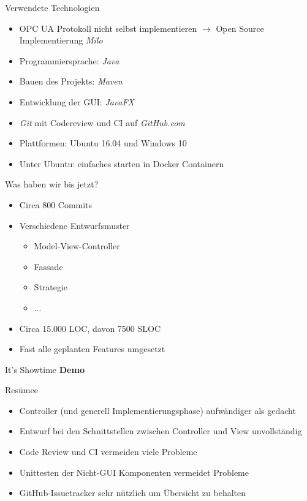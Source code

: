 \documentclass[22pt]{beamer}
\begin{document}
\begin{frame}{Verwendete Technologien}
\begin{itemize}[<+->]
 \item OPC UA Protokoll nicht selbst implementieren $\rightarrow$ Open Source Implementierung \emph{Milo}
 \item Programmiersprache: \emph{Java}
 \item Bauen des Projekts: \emph{Maven}
 \item Entwicklung der GUI: \emph{JavaFX}
 \item \emph{Git} mit Codereview und CI auf \emph{GitHub.com}
 \item Plattformen: Ubuntu 16.04 und Windows 10
 \item Unter Ubuntu: einfaches starten in Docker Containern
\end{itemize}
\end{frame}

\begin{frame}{Was haben wir bis jetzt?}
\begin{itemize}[<+->]
 \item Circa 800 Commits
 \item Verschiedene Entwurfsmuster
 \begin{itemize}
  \item Model-View-Controller
  \item Fassade
  \item Strategie
  \item ...
 \end{itemize}
 \item Circa 15.000 LOC, davon 7500 SLOC
 \item Fast alle geplanten Features umgesetzt
\end{itemize}
\end{frame}

\begin{frame}{It's Showtime}
\centering
\huge
\textbf{Demo}
\end{frame}

\begin{frame}{Resümee}
\begin{itemize}[<+->]
 \item Controller (und generell Implementierungsphase) aufwändiger als gedacht
 \item Entwurf bei den Schnittstellen zwischen Controller und View unvollständig
 \item Code Review und CI vermeiden viele Probleme
 \item Unittesten der Nicht-GUI Komponenten vermeidet Probleme
 \item GitHub-Issuetracker sehr nützlich um Übersicht zu behalten
\end{itemize}
\end{frame}
\end{document}
